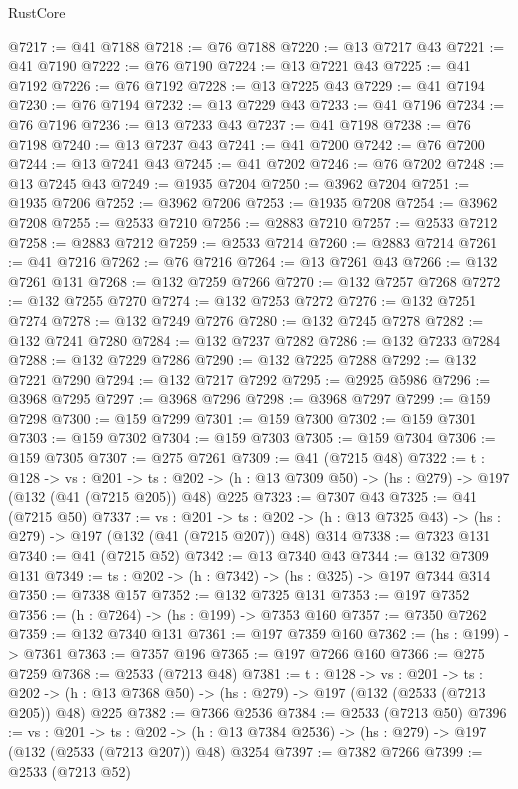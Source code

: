 \begin{lexlean}{RustCore}
\begin{coremodule}
@7217 := @41 @7188
@7218 := @76 @7188
@7220 := @13 @7217 @43
@7221 := @41 @7190
@7222 := @76 @7190
@7224 := @13 @7221 @43
@7225 := @41 @7192
@7226 := @76 @7192
@7228 := @13 @7225 @43
@7229 := @41 @7194
@7230 := @76 @7194
@7232 := @13 @7229 @43
@7233 := @41 @7196
@7234 := @76 @7196
@7236 := @13 @7233 @43
@7237 := @41 @7198
@7238 := @76 @7198
@7240 := @13 @7237 @43
@7241 := @41 @7200
@7242 := @76 @7200
@7244 := @13 @7241 @43
@7245 := @41 @7202
@7246 := @76 @7202
@7248 := @13 @7245 @43
@7249 := @1935 @7204
@7250 := @3962 @7204
@7251 := @1935 @7206
@7252 := @3962 @7206
@7253 := @1935 @7208
@7254 := @3962 @7208
@7255 := @2533 @7210
@7256 := @2883 @7210
@7257 := @2533 @7212
@7258 := @2883 @7212
@7259 := @2533 @7214
@7260 := @2883 @7214
@7261 := @41 @7216
@7262 := @76 @7216
@7264 := @13 @7261 @43
@7266 := @132 @7261 @131
@7268 := @132 @7259 @7266
@7270 := @132 @7257 @7268
@7272 := @132 @7255 @7270
@7274 := @132 @7253 @7272
@7276 := @132 @7251 @7274
@7278 := @132 @7249 @7276
@7280 := @132 @7245 @7278
@7282 := @132 @7241 @7280
@7284 := @132 @7237 @7282
@7286 := @132 @7233 @7284
@7288 := @132 @7229 @7286
@7290 := @132 @7225 @7288
@7292 := @132 @7221 @7290
@7294 := @132 @7217 @7292
@7295 := @2925 @5986
@7296 := @3968 @7295
@7297 := @3968 @7296
@7298 := @3968 @7297
@7299 := @159 @7298
@7300 := @159 @7299
@7301 := @159 @7300
@7302 := @159 @7301
@7303 := @159 @7302
@7304 := @159 @7303
@7305 := @159 @7304
@7306 := @159 @7305
@7307 := @275 @7261
@7309 := @41 (@7215 @48)
@7322 := {t : @128} ->
  {vs : @201} ->
  {ts : @202} -> (h : @13 @7309 @50) -> (hs : @279) -> @197 (@132 (@41 (@7215 @205)) @48) @225
@7323 := @7307 @43
@7325 := @41 (@7215 @50)
@7337 := {vs : @201} ->
  {ts : @202} -> (h : @13 @7325 @43) -> (hs : @279) -> @197 (@132 (@41 (@7215 @207)) @48) @314
@7338 := @7323 @131
@7340 := @41 (@7215 @52)
@7342 := @13 @7340 @43
@7344 := @132 @7309 @131
@7349 := {ts : @202} -> (h : @7342) -> (hs : @325) -> @197 @7344 @314
@7350 := @7338 @157
@7352 := @132 @7325 @131
@7353 := @197 @7352
@7356 := (h : @7264) -> (hs : @199) -> @7353 @160
@7357 := @7350 @7262
@7359 := @132 @7340 @131
@7361 := @197 @7359 @160
@7362 := (hs : @199) -> @7361
@7363 := @7357 @196
@7365 := @197 @7266 @160
@7366 := @275 @7259
@7368 := @2533 (@7213 @48)
@7381 := {t : @128} ->
  {vs : @201} ->
  {ts : @202} -> (h : @13 @7368 @50) -> (hs : @279) -> @197 (@132 (@2533 (@7213 @205)) @48) @225
@7382 := @7366 @2536
@7384 := @2533 (@7213 @50)
@7396 := {vs : @201} ->
  {ts : @202} -> (h : @13 @7384 @2536) -> (hs : @279) -> @197 (@132 (@2533 (@7213 @207)) @48) @3254
@7397 := @7382 @7266
@7399 := @2533 (@7213 @52)

\end{coremodule}
\end{lexlean}
